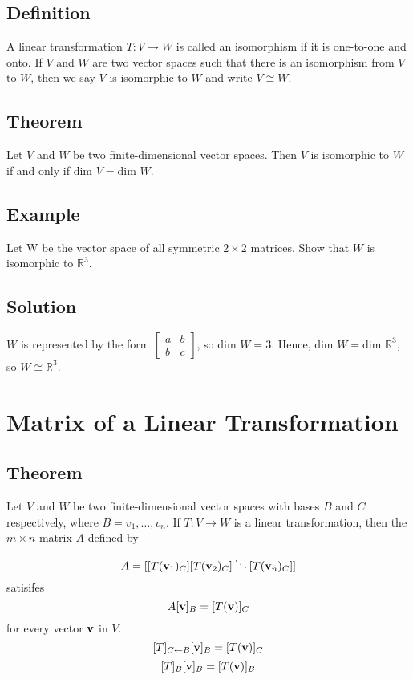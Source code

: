 \subsection*{Definition}
A linear transformation $T: V\to W$ is called an isomorphism if it is one-to-one
and onto. If $V$ and $W$ are two vector spaces such that there is an isomorphism
from $V$ to $W$, then we say $V$ is isomorphic to $W$ and write $V\cong W$.

\subsection*{Theorem}
Let $V$ and $W$ be two finite-dimensional vector spaces. Then $V$ is isomorphic to
$W$ if and only if $\text{dim } V = \text{dim } W$.

\subsection*{Example}
Let W be the vector space of all symmetric $2\times2$ matrices.
Show that $W$ is isomorphic to $\mathbb{R}^3$.

\subsection*{Solution}
$W$ is represented by the form $\begin{bmatrix}
        a & b \\
        b & c
    \end{bmatrix}$, so dim $W=3$. Hence, $\text{dim }W=\text{dim }\mathbb{R}^3$,
so $W\cong\mathbb{R}^3$.

\section{Matrix of a Linear Transformation}

\subsection*{Theorem}
Let $V$ and $W$ be two finite-dimensional vector spaces with bases $B$ and $C$
respectively, where $B = {v_1,\dots, v_n}$. If $T: V\to W$ is a linear
transformation, then the $m\times n$ matrix $A$ defined by
\[A=[[T(\mathbf{v}_1)_C][T(\mathbf{v}_2)_C]\ddots[T(\mathbf{v}_n)_C]]\]
satisifes
\[A[\mathbf{v}]_B=[T(\mathbf{v})]_C\]
for every vector $\mathbf{v}$ in $V$.
\[[T]_{C\leftarrow B}[\mathbf{v}]_B = [T(\mathbf{v})]_C\]
\[[T]_B[\mathbf{v}]_B = [T(\mathbf{v})]_B\]

